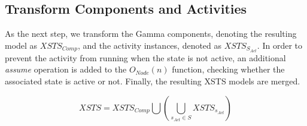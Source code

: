 \subsection{Transform Components and Activities}\label{ssec:transform-components}

As the next step, we transform the Gamma components, denoting the resulting model as \( \mathit{XSTS_{Comp}} \), and the activity instances, denoted as \( \mathit{XSTS_{S_{Act}}} \). In order to prevent the activity from running when the state is not active, an additional \emph{assume} operation is added to the \(O_\mathit{Node}(n)\) function, checking whether the associated state is active or not. Finally, the resulting XSTS models are merged.

\begin{equation*}
	XSTS = \mathit{XSTS_{Comp}} \bigcup \left( \bigcup_{s_\mathit{Act} \in S} \mathit{XSTS_{s_{Act}}} \right)
\end{equation*}
